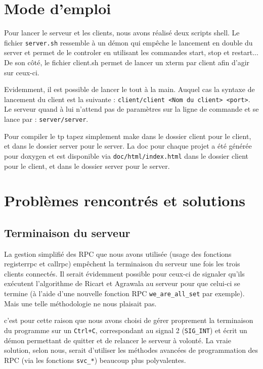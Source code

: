 \section{Mode d'emploi}

Pour lancer le serveur et les clients, nous avons réalisé deux scripts shell. Le fichier \verb|server.sh| ressemble à un démon qui empêche le lancement en double du server et permet de le controler en utilisant les commandes start, stop et restart... De son côté, le fichier client.sh permet de lancer un xterm par client afin d'agir sur ceux-ci.

Evidemment, il est possible de lancer le tout à la main. Auquel cas la syntaxe de lancement du client est la suivante : \verb|client/client <Nom du client> <port>|. Le serveur quand à lui n'attend pas de paramètres sur la ligne de commande et se lance par : \verb|server/server|.

Pour compiler le tp tapez simplement make dans le dossier client pour le client, et dans le dossier server pour le server. La doc pour chaque projet a été générée pour doxygen et est disponible via \verb|doc/html/index.html| dans le dossier client pour le client, et dans le dossier server pour le server.

\section{Problèmes rencontrés et solutions}
\subsection{Terminaison du serveur}

La gestion simplifié des RPC que nous avons utilisée (usage des fonctions registerrpc et callrpc) empêchent la terminaison du serveur une fois les trois clients connectés. Il serait évidemment possible pour ceux-ci de signaler qu'ils exécutent l'algorithme de Ricart et Agrawala au serveur pour que celui-ci se termine (à l'aide d'une nouvelle fonction RPC \verb|we_are_all_set| par exemple). Mais une telle méthodologie ne nous plaisait pas.

c'est pour cette raison que nous avons choisi de gérer proprement la terminaison du programme sur un \verb|Ctrl+C|, correspondant au signal 2 (\verb|SIG_INT|) et écrit un démon permettant de quitter et de relancer le serveur à volonté. La vraie solution, selon nous, serait d'utiliser les méthodes avancées de programmation des RPC (via les fonctions \verb|svc_*|) beaucoup plus polyvalentes.

